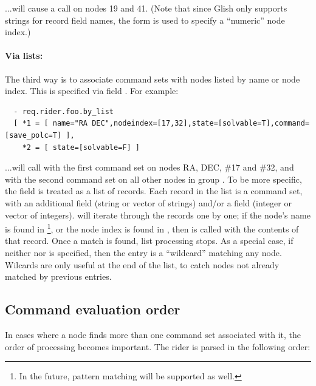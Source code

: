 \documentclass[10pt,twoside]{book}
\begin{document}
  ...will cause a  call on nodes 19 and 41. (Note that
  since Glish only supports strings for record field names, the 
  form is used to specify a ``numeric'' node index.)

  \paragraph{Via lists:} The third way is to associate command sets with nodes
  listed by name or node index. This is specified via field
  . For example:

\begin{verbatim}
  - req.rider.foo.by_list
  [ *1 = [ name="RA DEC",nodeindex=[17,32],state=[solvable=T],command=[save_polc=T] ],
    *2 = [ state=[solvable=F] ]
\end{verbatim}

  ...will call  with the first command set on nodes RA,
  DEC, \#17 and \#32, and with the second command set on all other nodes in
  group . To be more specific, the  field is
  treated as a list  of records. Each record in the list is a command set, with
  an additional  field (string or vector of strings) and/or a
   field (integer or vector of integers). 
  will iterate through the records one by one; if the node's name is found in
  \footnote{In the future, pattern matching will be supported as
  well.}, or the node index is found in , then
   is called with the contents of that record. Once a
  match is found, list processing stops. As a special case, if neither
   nor  is specified, then the entry is a ``wildcard''
  matching any node. Wilcards are only useful at the end of the list, to catch
  nodes not already matched by previous entries.
  
\subsection{Command evaluation order}

  In cases where a node finds more than one command set associated with it, the
  order of processing becomes important. The rider is parsed in the following
  order:
\end{document}

